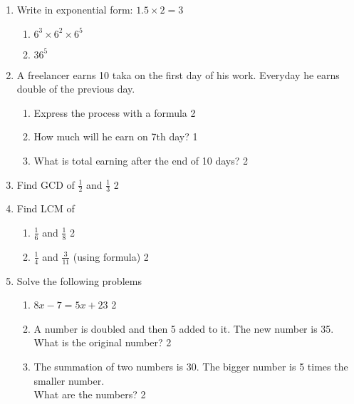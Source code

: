 \documentclass[10pt]{article}
\begin{document}
\begin{enumerate}

\item Write in exponential form: \hfill $1.5 \times 2 = 3$

\begin{enumerate}

\item $6^3 \times 6^2 \times 6^5$ 
\item $36^5$ 

\end{enumerate}

\item A freelancer earns 10 taka on the first day of his work. Everyday he earns double of the previous day. 

\begin{enumerate}
\item Express the process with a formula \hfill 2
\item How much will he earn on 7th day? \hfill 1
\item What is total earning after the end of 10 days? \hfill 2
\end{enumerate}

\item Find GCD of $\frac12$ and $\frac 13$ \hfill 2 
\item Find LCM of 

\begin{enumerate}
\item $\frac16$ and $\frac 18$ \hfill 2
\item $\frac 14$ and $\frac3{11}$ (using formula) \hfill 2
\end{enumerate}

\item Solve the following problems

\begin{enumerate}

\item $8x - 7 = 5x + 23$ \hfill 2
\item A number is doubled and then 5 added to it. The new number is 35. What is the original number? \hfill 2
\item The summation of two numbers is 30. The bigger number is 5 times the smaller number.\\ What are the numbers? \hfill 2

\end{enumerate}


\end{enumerate}
\end{document}
